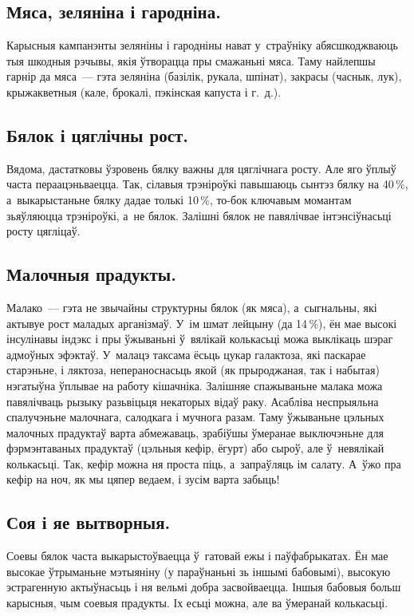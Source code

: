\subsection{Мяса, зеляніна і гародніна.}
Карысныя кампанэнты зеляніны і гародніны нават у~страўніку абясшкоджваюць тыя шкодныя рэчывы, якія ўтворацца пры смажаньні мяса. Таму найлепшы гарнір да мяса~--- гэта зеляніна (базілік, рукала, шпінат), закрасы (часнык, лук), крыжакветныя (кале, брокалі, пэкінская капуста і г.~д.).

\subsection{Бялок і цяглічны рост.}
Вядома, дастатковы ўзровень бялку важны для цяглічнага росту. Але яго ўплыў часта пераацэньваецца. Так, сілавыя трэніроўкі павышаюць сынтэз бялку на 40\,\%, а~выкарыстаньне бялку дадае толькі 10\,\%, то-бок ключавым момантам зьяўляюцца трэніроўкі, а~не бялок. Залішні бялок не павялічвае інтэнсіўнасьці росту цягліцаў.

\subsection{Малочныя прадукты.}
Малако~--- гэта не звычайны структурны бялок (як мяса), а~сыгнальны, які актывуе рост маладых арганізмаў. У~ім шмат лейцыну (да 14\,\%), ён мае высокі інсулінавы індэкс і пры ўжываньні ў~вялікай колькасьці можа выклікаць шэраг адмоўных эфэктаў. У~малацэ таксама ёсьць цукар галактоза, які паскарае старэньне, і ляктоза, непераноснасьць якой (як прыроджаная, так і набытая) нэгатыўна ўплывае на работу кішачніка. Залішняе спажываньне малака можа павялічваць рызыку разьвіцьця некаторых відаў раку. Асабліва неспрыяльна спалучэньне малочнага, салодкага і мучнога разам. Таму ўжываньне цэльных малочных прадуктаў варта абмежаваць, зрабіўшы ўмеранае выключэньне для фэрмэнтаваных прадуктаў (цэльныя кефір, ёгурт) або сыроў, але ў~невялікай колькасьці. Так, кефір можна ня проста піць, а~запраўляць ім салату. А~ўжо пра кефір на ноч, як мы цяпер ведаем, і зусім варта забыць!

\subsection{Соя і яе вытворныя.}
Соевы бялок часта выкарыстоўваецца ў~гатовай ежы і паўфабрыкатах. Ён мае высокае ўтрыманьне мэтыяніну (у параўнаньні зь іншымі бабовымі), высокую эстрагенную актыўнасьць і ня вельмі добра засвойваецца. Іншыя бабовыя больш карысныя, чым соевыя прадукты. Іх есьці можна, але ва ўмеранай колькасьці.

